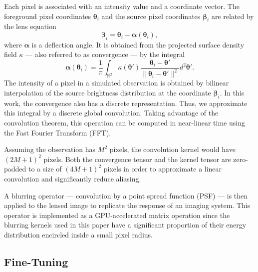 Each pixel is associated 
with an intensity value and a coordinate vector.
The foreground pixel coordinates $\boldsymbol{\theta}_i$ and the source 
pixel coordinates $\boldsymbol{\beta}_i$ are related by
the lens equation
\begin{equation}\label{eq:LensEquation}
        \bm{\beta}_i = \bm{\theta}_i - \bm{\alpha}(\bm{\theta}_i),
\end{equation}
where $\boldsymbol{\alpha}$ is a deflection angle.
It is obtained from the projected surface 
density field $\kappa$ --- also referred to as convergence --- by the integral
\begin{equation}\label{eq:alpha}
        \bm{\alpha}(\boldsymbol{\theta}_i) = 
        \frac{1}{\pi} \int_{\mathbb{R}^2}
        \kappa(\boldsymbol{\theta}') 
        \frac{\boldsymbol{\theta}_i
        - \boldsymbol{\theta}'}{\lVert \boldsymbol{\theta}_i - 
        \boldsymbol{\theta}' \rVert^2}
        d^2\boldsymbol{\theta}'.
\end{equation}
The intensity of a pixel in a simulated observation
is obtained by bilinear interpolation of the 
source brightness distribution at the coordinate $\boldsymbol{\beta}_i$.
In this work, the convergence also has a discrete representation. Thus, 
we approximate this integral by a discrete global convolution. Taking 
advantage of the convolution theorem, this operation 
can be computed in near-linear time using 
the Fast Fourier Transform (FFT). 

Assuming the observation 
has $M^2$ pixels, the convolution kernel %
would have $(2M + 1)^{2}$ pixels. 
Both the convergence tensor and the kernel tensor are zero-padded 
to a size of $(4M+1)^{2}$ pixels in order to approximate a linear 
convolution and significantly reduce aliasing.

A blurring operator --- convolution by a point spread function (PSF) --- is then 
applied to the lensed image to replicate the response of an imaging system. 
This operator is implemented as a GPU-accelerated matrix operation 
since the blurring kernels used in this paper have a significant proportion
of their energy distribution encircled inside a small pixel radius. 

\subsection{Fine-Tuning}\label{sec:fine-tuning}

